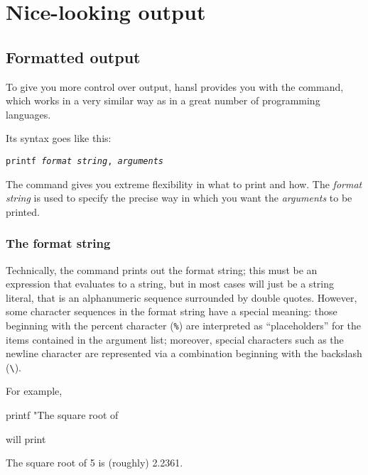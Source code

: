 \chapter{Nice-looking output}
\label{chap:formatting}

\section{Formatted output}
\label{sec:printf}

To give you more control over output, hansl provides you with the
 command, which works in a very similar way as in a great
number of programming languages.

Its syntax goes like this:
\begin{flushleft}
  \texttt{printf \emph{format string}, \emph{arguments}}
\end{flushleft}

The  command gives you extreme flexibility in what to
print and how. The \emph{format string} is used to specify the precise
way in which you want the \emph{arguments} to be printed.

\subsection{The format string}
\label{sec:fmtstring}

Technically, the  command prints out the format string;
this must be an expression that evaluates to a string, but in most
cases will just be a string literal, that is an alphanumeric sequence
surrounded by double quotes. However, some character sequences in the
format string have a special meaning: those beginning with the percent
character (\texttt{\%}) are interpreted as ``placeholders'' for the
items contained in the argument list; moreover, special characters
such as the newline character are represented via a combination
beginning with the backslash (\verb|\|).

For example,
\begin{code}
printf "The square root of %
\end{code}
will print 
\begin{code}
The square root of 5 is (roughly) 2.2361.
\end{code}

